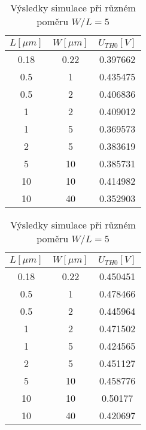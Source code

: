 \begin{table}[H]
    \begin{minipage}{0.5\textwidth}
        \centering
        \begin{tabular}{|c|c|c|}
            \hline
            \(L [\mu m]\) & \(W [\mu m]\) & \(U_{TH0} [V]\) \\ \hline
            0.18          & 0.22            & 0.397662	        \\ \hline
            0.5	          & 1               & 0.435475          \\ \hline
            0.5	          & 2               & 0.406836	        \\ \hline
            1	          & 2               & 0.409012	        \\ \hline
            1	          & 5               & 0.369573	        \\ \hline
            2	          & 5               & 0.383619	        \\ \hline
            5	          & 10              & 0.385731          \\ \hline
            10	          & 10              & 0.414982	        \\ \hline
            10	          & 40              & 0.352903	        \\ \hline
        \end{tabular}

        \vspace{5mm}
    \end{minipage}
    \hfill
    \begin{minipage}{0.5\textwidth}
        \centering
        \begin{tabular}{|c|c|c|}
            \hline
            \(L [\mu m]\) & \(W [\mu m]\) & \(U_{TH0} [V]\) \\ \hline
            0.18          & 0.22            & 0.450451	        \\ \hline
            0.5	          & 1               & 0.478466          \\ \hline
            0.5	          & 2               & 0.445964	        \\ \hline
            1	          & 2               & 0.471502	        \\ \hline
            1	          & 5               & 0.424565	        \\ \hline
            2	          & 5               & 0.451127	        \\ \hline
            5	          & 10              & 0.458776          \\ \hline
            10	          & 10              & 0.50177	        \\ \hline
            10	          & 40              & 0.420697	        \\ \hline
        \end{tabular}

        \vspace{5mm}
    \end{minipage}

    \caption{\label{tab:N_wl_const} Výsledky simulace při různém poměru \(W/L = 5\)}
\end{table}